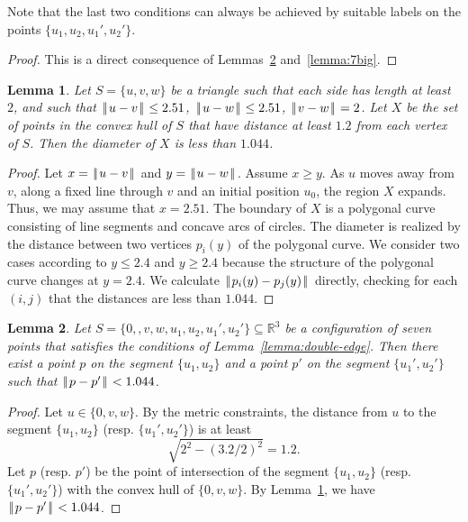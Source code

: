 \documentclass[11pt]{amsart}
\newcommand{\ring}[1]{\mathbb{#1}}
\def\|{{\hskip0.1em|\hskip-0.15em|\hskip0.1em}}
\let\subset=\subseteq
\newtheorem{lemma}{Lemma}
\begin{document}
Note that the last two conditions can always 
be achieved by suitable labels on the points $\{u_1,u_2,u_1',u_2'\}$.

\begin{proof}
This is a direct consequence of Lemmas~\ref{lemma:7small} and~\ref{lemma:7big}.
\end{proof}

\begin{lemma}\label{lemma:diam} 
Let $S=\{u,v,w\}$ be a triangle such that each side has length at least $2$, and such that $\|u-v\|\le 2.51$, $\|u-w\|\le 2.51$, $\|v-w\|=2$.  Let $X$ be the set of points in the convex hull of $S$ that have distance at least $1.2$ from each vertex of $S$.  Then the diameter of $X$ is less than $1.044$.
\end{lemma}

\begin{proof} Let $x=\|u-v\|$ and $y=\|u-w\|$.  Assume $x\ge y$.  As $u$ moves away from $v$, along a fixed line through $v$ and an initial position $u_0$, the region $X$ expands.  Thus, we may assume that $x=2.51$.   The boundary of $X$ is a polygonal curve consisting of line segments and concave arcs of circles.  The diameter is realized by the distance between two vertices $p_i(y)$ of the polygonal curve. We consider two cases according to $y\le 2.4$ and $y\ge 2.4$ because the structure of the polygonal curve changes at $y=2.4$.  We calculate $\|p_i(y)-p_j(y)\|$ directly, checking for each $(i,j)$ that the distances are less than $1.044$.
\end{proof}

\begin{lemma}\label{lemma:7small}  
Let $S=\{0,,v,w,u_1,u_2,u_1',u_2'\}\subset\ring{R}^3$
be a configuration of seven points that satisfies
the conditions of Lemma~\ref{lemma:double-edge}.  Then there exist
a point $p$ on the segment $\{u_1,u_2\}$ and  a point $p'$ on the segment
$\{u_1',u_2'\}$ such that $\|p-p'\|<1.044$.
\end{lemma}

\begin{proof} Let $u\in\{0,v,w\}$.  By the metric constraints, the
distance from $u$ to the segment $\{u_1,u_2\}$ (resp. $\{u_1',u_2'\}$) is at least
$$\sqrt{2^2 - (3.2/2)^2} = 1.2.$$
Let $p$ (resp. $p'$) be the point of intersection of the segment $\{u_1,u_2\}$ 
(resp. $\{u_1',u_2'\}$) with
the convex hull of $\{0,v,w\}$.  By Lemma~\ref{lemma:diam},
we have $\|p-p'\|<1.044$.
\end{proof}
\end{document}
